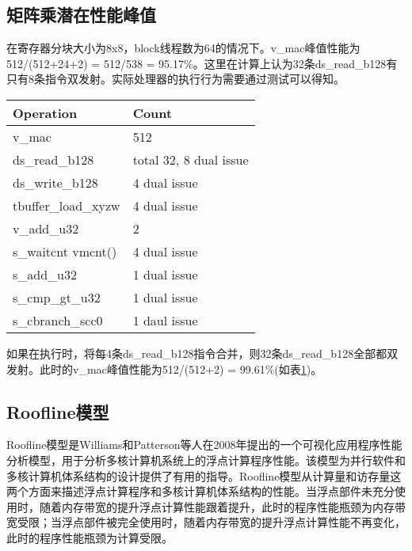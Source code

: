 \subsection{矩阵乘潜在性能峰值}
在寄存器分块大小为8x8，block线程数为64的情况下。v\_mac峰值性能为512/(512+24+2) = 512/538 = 95.17\%。这里在计算上认为32条ds\_read\_b128有只有8条指令双发射。实际处理器的执行行为需要通过测试可以得知。
\begin{table}[htbp]
	\label{tab:fijiFFMA}
	\begin{center}
		\begin{tabular}{ | l | p{4cm} |}
			\hline
			Operation & Count \\ \hline
			v\_mac & 512  \\ \hline
			ds\_read\_b128 & total 32, 8 dual issue \\ \hline
			ds\_write\_b128 & 4 dual issue \\ \hline
			tbuffer\_load\_xyzw & 4 dual issue \\ \hline
			v\_add\_u32 & 2 \\ \hline
			s\_waitcnt vmcnt() & 4 dual issue \\ \hline
			s\_add\_u32 & 1 dual issue \\ \hline
			s\_cmp\_gt\_u32 & 1 dual issue \\ \hline
			s\_cbranch\_scc0 & 1 daul issue \\
			\hline
		\end{tabular}
	\end{center}	
\end{table}

如果在执行时，将每4条ds\_read\_b128指令合并，则32条ds\_read\_b128全部都双发射。此时的v\_mac峰值性能为512/(512+2) = 99.61\%(如表\ref{tab:fijiFFMA})。

\subsection{Roofline模型}
Roofline模型是Williams和Patterson等人在2008年提出的一个可视化应用程序性能分析模型，用于分析多核计算机系统上的浮点计算程序性能。该模型为并行软件和多核计算机体系结构的设计提供了有用的指导。Roofline模型从计算量和访存量这两个方面来描述浮点计算程序和多核计算机体系结构的性能。当浮点部件未充分使用时，随着内存带宽的提升浮点计算性能跟着提升，此时的程序性能瓶颈为内存带宽受限；当浮点部件被完全使用时，随着内存带宽的提升浮点计算性能不再变化，此时的程序性能瓶颈为计算受限。

